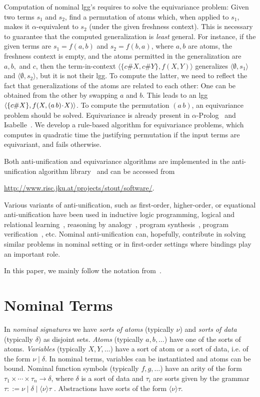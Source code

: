 \documentclass{llncs}
\newcommand{\swap}[2]{\ensuremath{(#1\, #2)}}
\newcommand{\permap}{{\mkern 1mu\cdot \mkern 1mu}}
\newcommand{\np}[2]{\langle #1, \allowbreak #2\rangle}
\begin{document}
Computation of nominal lgg's requires to solve the equivariance
problem: Given two terms $s_1$ and $s_2$, find a permutation of atoms
which, when applied to $s_1$, makes it $\alpha$-equivalent to $s_2$
(under the given freshness context). This is necessary to guarantee
that the computed generalization is \emph{least} general. For
instance, if the given terms are $s_1=f(a,b)$ and $s_2=f(b,a)$, where
$a,b$ are atoms, the freshness context is empty, and the atoms
permitted in the generalization are $a,b,$ and $c$, then the
term-in-context $\np{\{c\#X, c\#Y\}}{f(X,Y)}$ generalizes
$\np{\emptyset}{s_1}$ and $\np{\emptyset}{s_2}$, but it is not their
lgg. To compute the latter, we need to reflect the fact that
generalizations of the atoms are related to each other: One can be
obtained from the other by swapping $a$ and $b$. This leads to an lgg
$\np{\{c\#X\}}{f(X,\swap{a}{b}\permap X)}$. To compute the permutation
$\swap{a}{b}$, an equivariance problem should be solved. Equivariance is
already present in $\alpha$-Prolog~\cite{alphaprolog} and 
Isabelle~\cite{isabelle}.  We develop a rule-based algorithm
for equivariance problems, which computes in quadratic time the
justifying permutation if the input terms are equivariant, and fails
otherwise. 

Both anti-unification and equivariance algorithms are implemented in the anti-unification algorithm library~\cite{DBLP:conf/jelia/BaumgartnerK14} and can be accessed from

\url{http://www.risc.jku.at/projects/stout/software/}.


Various variants of anti-unification, such as first-order,
higher-order, or equational anti-unification have been used in
inductive logic programming, logical and relational
learning~\cite{DeRaedt2008}, reasoning by
analogy~\cite{DBLP:conf/ausai/KrumnackSGK07}, program
synthesis~\cite{DBLP:books/sp/Schmid03}, program
verification~\cite{DBLP:journals/amai/LuMHH00}, etc. Nominal
anti-unification can, hopefully, contribute in solving similar
problems in nominal setting or in first-order settings where bindings play
an important role.

In this paper, we mainly follow the notation
from~\cite{DBLP:journals/tocl/LevyV12}.




\section{Nominal Terms}
\label{sect:nominal}
In \emph{nominal signatures}
we have \emph{sorts of atoms} (typically $\nu$) and \emph{sorts of
  data} (typically $\delta$) as disjoint sets. \emph{Atoms} (typically
$a, b, \ldots$) have one of the sorts of atoms. \emph{Variables}
(typically $ X, Y, \ldots$) have a sort of atom or a sort of data,
i.e. of the form $\nu \mid \delta$. In nominal terms, variables can
be instantiated and atoms can be bound. Nominal function symbols
(typically $ f, g, \ldots$) have an arity of the form $\tau_1 \times
\cdots\times \tau_n \rightarrow \delta$, where $\delta$ is a sort of
data and $\tau_i$ are sorts given by the grammar $\tau ::= \nu \mid
\delta \mid \langle \nu\rangle \tau$ . Abstractions have sorts of the
form $\langle \nu\rangle \tau.$ 
\end{document}
